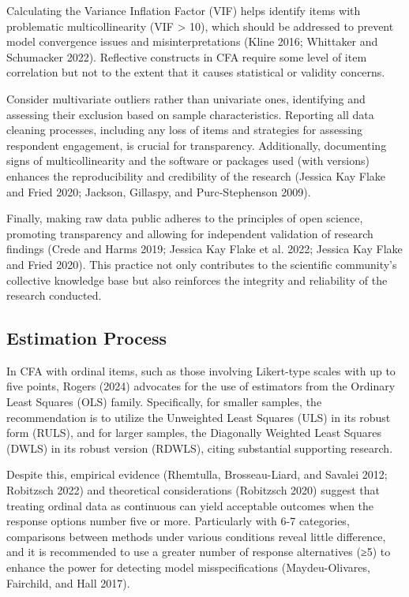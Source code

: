\documentclass[
  a4paper,
]{article}
\begin{document}
Calculating the Variance Inflation Factor (VIF) helps identify items
with problematic multicollinearity (VIF \textgreater{} 10), which should
be addressed to prevent model convergence issues and misinterpretations
(Kline 2016; Whittaker and Schumacker 2022). Reflective constructs in
CFA require some level of item correlation but not to the extent that it
causes statistical or validity concerns.

Consider multivariate outliers rather than univariate ones, identifying
and assessing their exclusion based on sample characteristics. Reporting
all data cleaning processes, including any loss of items and strategies
for assessing respondent engagement, is crucial for transparency.
Additionally, documenting signs of multicollinearity and the software or
packages used (with versions) enhances the reproducibility and
credibility of the research (Jessica Kay Flake and Fried 2020; Jackson,
Gillaspy, and Purc-Stephenson 2009).

Finally, making raw data public adheres to the principles of open
science, promoting transparency and allowing for independent validation
of research findings (Crede and Harms 2019; Jessica Kay Flake et al.
2022; Jessica Kay Flake and Fried 2020). This practice not only
contributes to the scientific community's collective knowledge base but
also reinforces the integrity and reliability of the research conducted.

\subsection{Estimation Process}\label{estimation-process}

In CFA with ordinal items, such as those involving Likert-type scales
with up to five points, Rogers (2024) advocates for the use of
estimators from the Ordinary Least Squares (OLS) family. Specifically,
for smaller samples, the recommendation is to utilize the Unweighted
Least Squares (ULS) in its robust form (RULS), and for larger samples,
the Diagonally Weighted Least Squares (DWLS) in its robust version
(RDWLS), citing substantial supporting research.

Despite this, empirical evidence (Rhemtulla, Brosseau-Liard, and Savalei
2012; Robitzsch 2022) and theoretical considerations (Robitzsch 2020)
suggest that treating ordinal data as continuous can yield acceptable
outcomes when the response options number five or more. Particularly
with 6-7 categories, comparisons between methods under various
conditions reveal little difference, and it is recommended to use a
greater number of response alternatives (≥5) to enhance the power for
detecting model misspecifications (Maydeu-Olivares, Fairchild, and Hall
2017).
\end{document}
